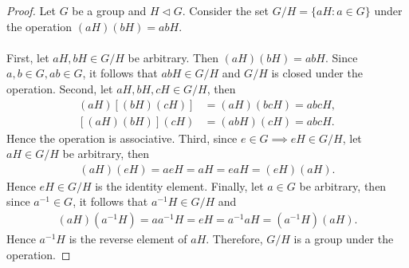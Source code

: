 \documentclass{article}
\theoremstyle{definition}
\begin{document}
     \begin{proof}
        Let $G$ be a group and $H \lhd G$. Consider the set $G/H = \{aH:a \in G\}$ under the operation $(aH)(bH)=abH$.
        \\ \\
        First, let $aH,bH \in G/H$ be arbitrary. Then $(aH)(bH)=abH$. Since $a,b \in G, ab \in G$, it follows that $abH \in G/H$ and $G/H$ is closed under the operation. Second, let $aH,bH,cH \in G/H$, then
        \begin{align*}
            (aH)[(bH)(cH)] &= (aH)(bcH) = abcH, \\
            [(aH)(bH)](cH) &= (abH)(cH) = abcH.
        \end{align*}
        Hence the operation is associative. Third, since $e \in G \implies eH \in G/H$, let $aH \in G/H$ be arbitrary, then
        \begin{align*}
            (aH)(eH) = aeH = aH = eaH = (eH)(aH).
        \end{align*}
        Hence $eH \in G/H$ is the identity element. Finally, let $a \in G$ be arbitrary, then since $a^{-1} \in G$, it follows that $a^{-1}H \in G/H$ and 
        \begin{align*}
            (aH)(a^{-1}H) = aa^{-1}H = eH = a^{-1}aH = (a^{-1}H)(aH).
        \end{align*}
        Hence $a^{-1}H$ is the reverse element of $aH$. Therefore, $G/H$ is a group under the operation.
     \end{proof}
     
\end{document}
